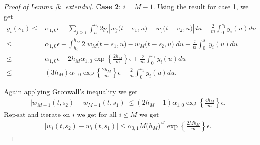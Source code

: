 \documentclass[10pt,a4paper]{amsart}
\begin{document}
\begin{proof}[Proof of Lemma \ref{k_extendw}]
\textbf{Case 2}: $i=M-1$.
Using the result for case 1, we get
\begin{align*} 
y_i(s_1)\leq& \alpha_{1,0}\epsilon
+\sum_{j>i}\int_{ h_i}^{h_j}2p_i
\left|
w_j\big(t-s_1,u\big)-w_j\big(t-s_2,u\big)
\right|
du+\frac{2}{m}\int_{0}^{s_1}y_i(u)du\\
\leq& \alpha_{1,0}\epsilon
+\int_{ h_i}^{h_M}2
\left|
w_M\big(t-s_1,u\big)-w_M\big(t-s_2,u\big)
\right|
du +\frac{2}{m}\int_{0}^{s_1}y_i(u)du\\
\leq& \alpha_{1,0}\epsilon+2h_M\alpha_{1,0} \exp\left\{\frac{2h_M}{m}\right\}\epsilon+\frac{2}{m}\int_{0}^{s_1}y_i(u)du\\
\leq&(3h_M)\alpha_{1,0} \exp\left\{\frac{2h_M}{m}\right\}\epsilon+\frac{2}{m}\int_{0}^{s_1}y_i(u)du.
\end{align*} 

Again applying Gronwall's inequality we get
\begin{align*} 
\left|w_{M-1}(t,s_2)-w_{M-1}(t,s_1)\right|\leq(2h_M+1)\alpha_{1,0} \exp\left\{\frac{4h_M}{m}\right\}\epsilon. 
\end{align*} 
Repeat and iterate on $i$ we get for all $i\leq M$
we get 
\begin{align*} 
\left|w_i(t,s_2)-w_i(t,s_1)\right|\leq \alpha_{0,1}M\big(h_M\big)^M\exp\left\{\frac{2Mh_M}{m}\right\}\epsilon. 
\end{align*} 
\end{proof}
\end{document}
